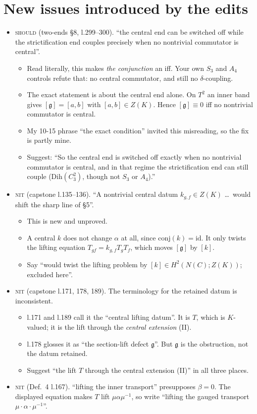 \documentclass[10pt]{article}
\newcommand{\iss}[1]{\textsc{#1}}
\begin{document}
\section{New issues introduced by the edits}
\begin{itemize}
\item \iss{should} (two-ends \S8, l.299--300). ``the central end can be switched off while the strictification end couples precisely when no nontrivial commutator is central''.
  \begin{itemize}
  \item Read literally, this makes \emph{the conjunction} an iff. Your own $S_3$ and $A_4$ controls refute that: no central commutator, and still no $\delta$-coupling.
  \item The exact statement is about the central end alone. On $T^2$ an inner band gives $[\mathfrak g]=[a,b]$ with $[a,b]\in Z(K)$. Hence $[\mathfrak g]\equiv0$ iff no nontrivial commutator is central.
  \item My 10-15 phrase ``the exact condition'' invited this misreading, so the fix is partly mine.
  \item Suggest: ``So the central end is switched off exactly when no nontrivial commutator is central, and in that regime the strictification end can still couple ($\mathrm{Dih}(C_3^2)$, though not $S_3$ or $A_4$).''
  \end{itemize}
\item \iss{nit} (capstone l.135--136). ``A nontrivial central datum $k_{g,f}\in Z(K)$ \dots\ would shift the sharp line of \S5''.
  \begin{itemize}
  \item This is new and unproved.
  \item A central $k$ does not change $\alpha$ at all, since $\mathrm{conj}(k)=\mathrm{id}$. It only twists the lifting equation $T_{gf}=k_{g,f}T_gT_f$, which moves $[\mathfrak g]$ by $[k]$.
  \item Say ``would twist the lifting problem by $[k]\in H^2(N(C);Z(K))$; excluded here''.
  \end{itemize}
\item \iss{nit} (capstone l.171, 178, 189). The terminology for the retained datum is inconsistent.
  \begin{itemize}
  \item l.171 and l.189 call it the ``central lifting datum''. It is $T$, which is $K$-valued; it is the lift through the \emph{central extension} (II).
  \item l.178 glosses it as ``the section-lift defect $\mathfrak g$''. But $\mathfrak g$ is the obstruction, not the datum retained.
  \item Suggest ``the lift $T$ through the central extension (II)'' in all three places.
  \end{itemize}
\item \iss{nit} (Def.~4 l.167). ``lifting the inner transport'' presupposes $\beta=0$. The displayed equation makes $T$ lift $\mu\alpha\mu^{-1}$, so write ``lifting the gauged transport $\mu\cdot\alpha\cdot\mu^{-1}$''.
\end{itemize}
\end{document}
